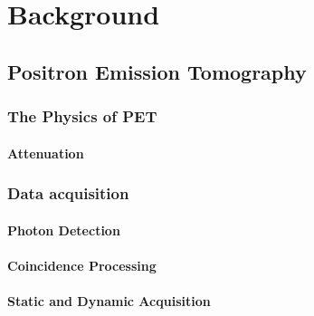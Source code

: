 \chapter{Background} \label{background}
    \blindtext
    
    \section{Positron Emission Tomography}  \label{positron_emission_tomography}
        \blindtext
        
        \subsection{The Physics of PET} \label{the_physics_of_pet}
            \blindtext
            
            \subsubsection{Attenuation} \label{attenuation}
                \blindtext
        
        \subsection{Data acquisition} \label{data_acquisition}
            \blindtext
            
            \subsubsection{Photon Detection}  \label{photon_detection}
                \blindtext
            
            \subsubsection{Coincidence Processing}  \label{coincidence_processing}
                \blindtext
            
            \subsubsection{Static and Dynamic Acquisition}  \label{static_and_dynamic_acquisition}
                \blindtext
            
